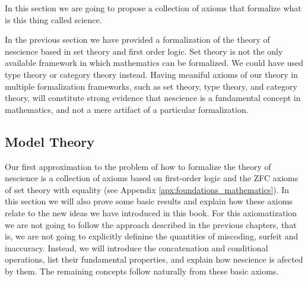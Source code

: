 In this section we are going to propose a collection of axioms that formalize what is this thing called science. 

In the previous section we have provided a formalization of the theory of nescience based in set theory and first order logic. Set theory is not the only available framework in which mathematics can be formalized. We could have used type theory or category theory instead. Having meaniful axioms of our theory in multiple formalization frameworks, such as set theory, type theory, and category theory, will constitute strong evidence that nescience is a fundamental concept in mathematics, and not a mere artifact of a particular formalization.

%
%

\subsection{Model Theory}

Our first approximation to the problem of how to formalize the theory of nescience is a collection of axioms based on first-order logic and the ZFC axioms of set theory with equality (see Appendix \ref{apx:foundations_mathematics}). In this section we will also prove some basic results and explain how these axioms relate to the new ideas we have introduced in this book. For this axiomatization we are not going to follow the approach described in the previous chapters, that is, we are not going to explicitly definine the quantities of miscoding, surfeit and inaccuracy. Instead, we will introduce the concatenation and conditional operations, list their fundamental properties, and explain how nescience is afected by them. The remaining concepts follow naturally from these basic axioms.


